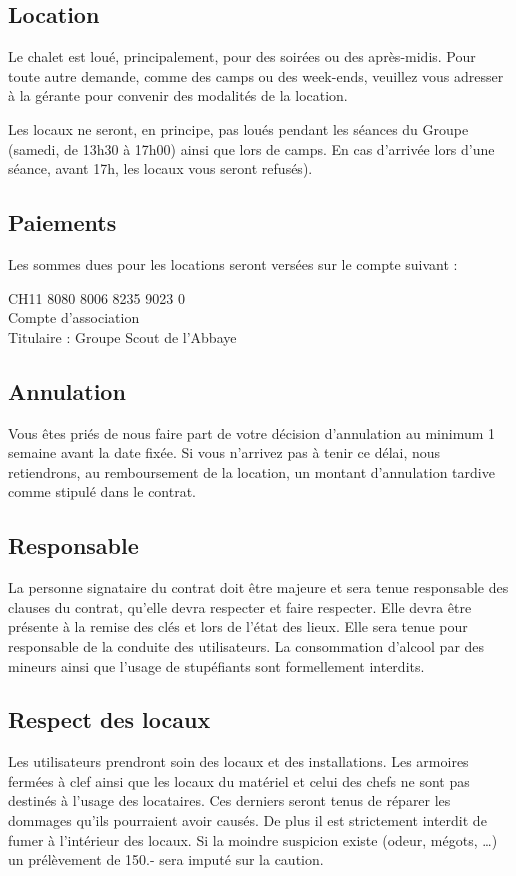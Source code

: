 \documentclass[a4paper,12pt]{extarticle}
\begin{document}
\subsection{Location}

Le chalet est loué, principalement, pour des soirées ou des après-midis.
Pour toute autre demande, comme des camps ou des week-ends, veuillez vous adresser à la gérante pour convenir des modalités de la location.

{\color{red} Les locaux ne seront, en principe, pas loués pendant les séances du Groupe (samedi, de 13h30 à 17h00) ainsi que lors de camps. En cas d'arrivée lors d'une séance, avant 17h, les locaux vous seront refusés). }

\subsection{Paiements}
Les sommes dues pour les locations seront versées sur le compte suivant :

CH11 8080 8006 8235 9023 0 \\
Compte d'association \\
Titulaire : Groupe Scout de l'Abbaye \\

\subsection{Annulation}

Vous êtes priés de nous faire part de votre décision d'annulation au minimum 1 semaine avant la date fixée.
Si vous n'arrivez pas à tenir ce délai, nous retiendrons, au remboursement de la location, un montant d'annulation tardive comme stipulé dans le contrat.

\subsection{Responsable}
La personne signataire du contrat doit être majeure et sera tenue responsable des clauses du contrat, qu'elle devra respecter et faire respecter.
Elle devra être présente à la remise des clés et lors de l'état des lieux. Elle sera tenue pour responsable de la conduite des utilisateurs.
La consommation d'alcool par des mineurs ainsi que l'usage de stupéfiants sont formellement interdits.

\subsection{Respect des locaux}
Les utilisateurs prendront soin des locaux et des installations.
Les armoires fermées à clef ainsi que les locaux du matériel et celui des chefs ne sont pas destinés à l'usage des locataires.
Ces derniers seront tenus de réparer les dommages qu'ils pourraient avoir causés.
De plus {\color{red} il est strictement interdit de fumer à l'intérieur des locaux.}
Si la moindre suspicion existe (odeur, mégots, …) un prélèvement de 150.- sera imputé sur la caution.
\end{document}
